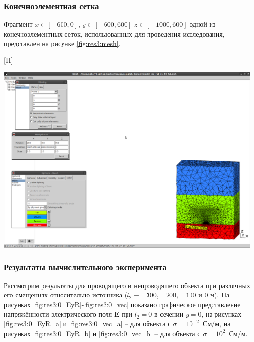\documentclass[a4paper,14pt]{article}
\makeatletter
\renewenvironment{figure}[1][\fps@figure]{
  \edef\@tempa{\noexpand\@float{figure}[#1]}
  \@tempa
  \addtocounter{foofigure}{1}
}{
  \end@float
}
\makeatother
\begin{document}
\subsubsection{Конечноэлементная сетка}
Фрагмент $x \in [-600,0]$, $y \in [-600,600]$ $z \in [-1000,600]$ одной из конечноэлементных сеток, использованных для проведения исследования, представлен на рисунке \ref{fig:res3:mesh}.

\begin{figure}[H]
	\centering
	\includegraphics[trim=390mm 20mm 5mm 195mm,clip,scale=0.5]{research-3/mesh/mesh.png}
	\caption{фрагмент конечноэлементной сетки}
	\label{fig:res3:mesh}
\end{figure}

\subsubsection{Результаты вычислительного эксперимента}
Рассмотрим результаты для проводящего и непроводящего объекта при различных его смещениях относительно источника ($l_2=-300$, $-200$, $-100$ и $0$ м). На рисунках \ref{fig:res3:0_EyR}-\ref{fig:res3:0_vec} показано графическое представление напряжённости электрического поля $\mathbf{E}$ при $l_2=0$ в сечении $y=0$, на рисунках \ref{fig:res3:0_EyR_a} и \ref{fig:res3:0_vec_a} -- для объекта с $\sigma=10^{-2}$~См/м, на рисунках \ref{fig:res3:0_EyR_b} и \ref{fig:res3:0_vec_b} -- для объекта с $\sigma=10^{2}$~См/м.

\end{document}
